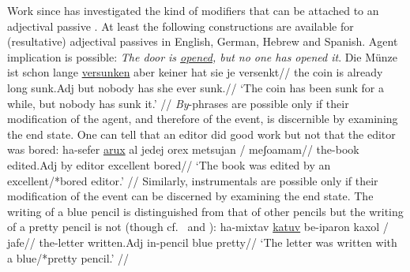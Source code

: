 Work since has investigated the kind of modifiers that can be attached to an adjectival passive \citep{meltzerasscher11,mcintyre13,alexiadouetal14,bruening14nllt,gehrkemarco14}. At least the following constructions are available for (resultative) adjectival passives in English, German, Hebrew and Spanish{. Agent implication is possible:}
\pex
	\a \ljudge{*} \emph{The door is \underline{opened}, but no one has opened it}.
	\a \ljudge{*} \begingl
		\gla Die M\"unze ist schon lange \underline{versunken} aber keiner hat sie je versenkt//
		\glb the coin is already long sunk.Adj but nobody has she ever sunk.//
		\glft `The coin has been sunk for a while, but nobody has sunk it.' //
	\endgl
\xe
{\emph{By}-phrases are possible only if their modification of the agent, and therefore of the event, is discernible by examining the end state. One can tell that an editor did good work but not that the editor was bored:}
\ex
	\begingl
		\gla ha-sefer \underline{arux} {al jedej} orex {\cmark}metsujan / {\xmark}meʃoamam//
		\glb the-book edited.Adj by editor \phantom{\cmark}excellent {} \phantom{\xmark}bored//
		\glft `The book was edited by an excellent/*bored editor.' //
	\endgl
\xe
{Similarly, instrumentals are possible only if their modification of the event can be discerned by examining the end state. The writing of a blue pencil is distinguished from that of other pencils but the writing of a pretty pencil is not} (though cf.~\citealt{mcintyre13} and \citealt{bruening14nllt}):
\ex
	\begingl
		\gla ha-mixtav \underline{katuv} be-iparon {\cmark}kaxol / {\xmark}jafe//
		\glb the-letter written.Adj in-pencil \phantom{\cmark}blue {} \phantom{\xmark}pretty//
		\glft `The letter was written with a blue/*pretty pencil.' //
	\endgl
\xe

